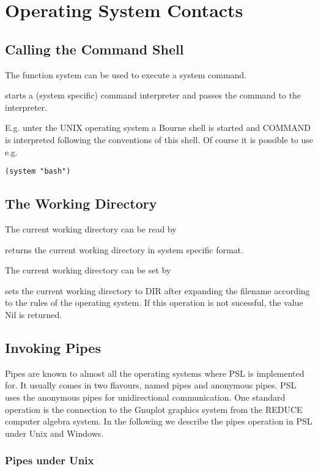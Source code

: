 \chapter*{Operating System Contacts}

\section{Calling the Command Shell}

The function system can be used to execute a system command.

{ starts a (system specific) command interpreter and passes the
command to the interpreter.}

E.g. unter the UNIX operating system a Bourne shell is started and
COMMAND is interpreted following the conventions of this shell.
Of course it is possible to use e.g.
\begin{verbatim}
(system "bash")
\end{verbatim}


\section{The Working Directory}

The current working directory can be read by

{returns the current working directory in system specific format.}

The current working directory can be set by

{sets the current working directory to DIR after expanding the
filename according to the rules of the operating system. If this operation
is not sucessful, the value Nil is returned.}

\section{Invoking Pipes}

Pipes are known to almost all the operating systems where PSL is implemented
for. It usually comes in two flavours, named pipes and anonymous pipes.
PSL uses the anonymous pipes for unidirectional communication.
One standard operation is the connection to the Gnuplot graphics system
from the REDUCE computer algebra system.
In the following we describe the pipes operation in PSL under Unix and
Windows.

\subsection{Pipes under Unix}

